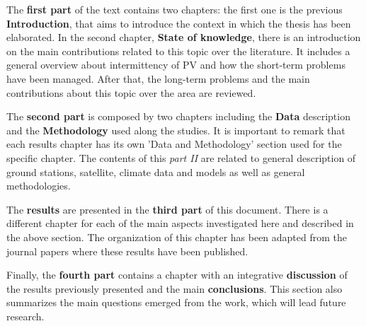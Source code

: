 The \textbf{first part} of the text contains two chapters: the first one is the previous \textbf{Introduction}, that aims to introduce the context in which the thesis has been elaborated. In the second chapter, \textbf{State of knowledge}, there is an introduction on the main contributions related to this topic over the literature. It includes a general overview about intermittency of PV and how the short-term problems have been managed. After that, the long-term problems and the main contributions about this topic over the area are reviewed. %

The \textbf{second part} is composed by two chapters including the \textbf{Data} description and the \textbf{Methodology} used along the studies. It is important to remark that each results chapter has its own 'Data and Methodology' section used for the specific chapter. The contents of this \textit{part II} are related to general description of ground stations, satellite, climate data and models as well as general methodologies.

The \textbf{results} are presented in the \textbf{third part} of this document. There is a different chapter for each of the main aspects investigated here and described in the above section. The organization of this chapter has been adapted from the journal papers where these results have been published.

Finally, the \textbf{fourth part} contains a chapter with an integrative \textbf{discussion} of the results previously presented and the main \textbf{conclusions}. This section also summarizes the main questions emerged from the work, which will lead future research.

